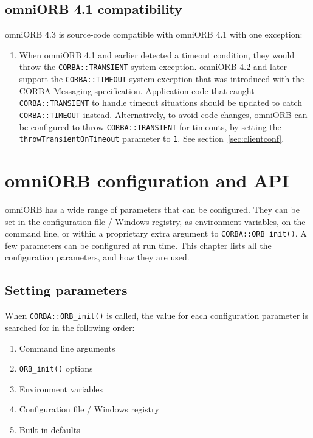 \documentclass[11pt,oneside,a4paper]{book}
\newcommand{\code}[1]{\texttt{#1}}
\newcommand{\op}[1]{\texttt{#1()}}
\newcommand{\dsc}{\discretionary{}{}{}}
\begin{document}
\section{omniORB 4.1 compatibility}

omniORB 4.3 is source-code compatible with omniORB 4.1 with one
exception:

\begin{enumerate}

\item When omniORB 4.1 and earlier detected a timeout condition, they
  would throw the \code{CORBA::TRANSIENT} system exception. omniORB
  4.2 and later support the \code{CORBA::TIMEOUT} system exception
  that was introduced with the CORBA Messaging specification.
  Application code that caught \code{CORBA::TRANSIENT} to handle
  timeout situations should be updated to catch \code{CORBA::TIMEOUT}
  instead. Alternatively, to avoid code changes, omniORB can be
  configured to throw \code{CORBA::TRANSIENT} for timeouts, by setting
  the \code{throwTransient\dsc{}OnTimeout} parameter to \code{1}. See
  section~\ref{sec:clientconf}.

\end{enumerate}


\chapter{omniORB configuration and API}
\label{chap:config}

omniORB has a wide range of parameters that can be configured. They
can be set in the configuration file / Windows registry, as
environment variables, on the command line, or within a proprietary
extra argument to \op{CORBA::ORB\_init}. A few parameters can be
configured at run time. This chapter lists all the configuration
parameters, and how they are used.

\section{Setting parameters}

When \op{CORBA::ORB\_init} is called, the value for each configuration
parameter is searched for in the following order:

\begin{enumerate}

\item Command line arguments
\item \op{ORB\_init} options
\item Environment variables
\item Configuration file / Windows registry
\item Built-in defaults

\end{enumerate}
\end{document}
